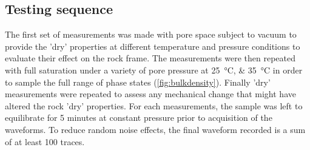 \subsection{Testing sequence}
The first set of measurements was made with pore space subject to vacuum to
provide the 'dry' properties at different temperature and pressure conditions to
evaluate their effect on the rock frame. The measurements were then repeated
with full  saturation under a variety of pore pressure at
\SIlist{25;35}{\degreeCelsius} in order to sample the full range of 
phase states (\cref{fig:bulkdensity}). Finally 'dry' measurements were repeated
to assess any mechanical change that might have altered the rock 'dry'
properties. For each measurements, the sample was left to equilibrate for
\num{5} minutes at constant pressure prior to acquisition of the waveforms. To
reduce random noise effects, the final waveform recorded is a sum of at least
\num{100} traces.

